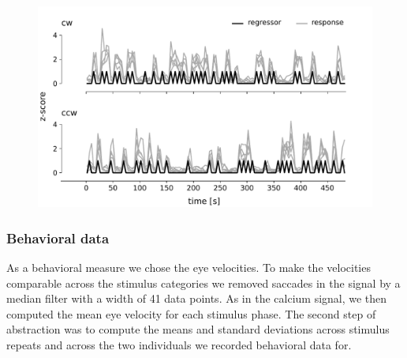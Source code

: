 \begin{figure}[H]
    \centering
    \includegraphics[width=0.8\linewidth]{figures/regressor.pdf}
    \label{fig:regressor}
\end{figure}

\subsubsection{Behavioral data}

As a behavioral measure we chose the eye velocities. To make the velocities comparable across the stimulus categories we removed saccades in the signal by a median filter with a width of 41 data points. As in the calcium signal, we then computed the mean eye velocity for each stimulus phase. The second step of abstraction was to compute the means and standard deviations across stimulus repeats and across the two individuals we recorded behavioral data for.  

\FloatBarrier